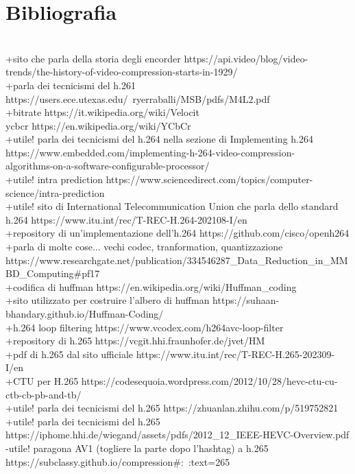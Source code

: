 \documentclass[a4paper,12pt, oneside]{article}
\begin{document}
\section{Bibliografia}
\\+sito che parla della storia degli encorder https://api.video/blog/video-trends/the-history-of-video-compression-starts-in-1929/
\\+parla dei tecnicismi del h.261 https://users.ece.utexas.edu/~ryerraballi/MSB/pdfs/M4L2.pdf
\\+bitrate https://it.wikipedia.org/wiki/Velocit%
\\ycbcr https://en.wikipedia.org/wiki/YCbCr
\\+utile! parla dei tecnicismi del h.264 nella sezione di Implementing h.264 https://www.embedded.com/implementing-h-264-video-compression-\\algorithms-on-a-software-configurable-processor/
\\+utile! intra prediction https://www.sciencedirect.com/topics/computer-science/intra-prediction
\\+utile! sito di International Telecommunication Union che parla dello standard h.264 https://www.itu.int/rec/T-REC-H.264-202108-I/en
\\+repository di un'implementazione dell'h.264 https://github.com/cisco/openh264
\\+parla di molte cose... vechi codec, tranformation, quantizzazione https://www.researchgate.net/publication/334546287_Data_Reduction_in_MMBD_Computing#pf17
\\+codifica di huffman https://en.wikipedia.org/wiki/Huffman_coding
\\+sito utilizzato per costruire l'albero di huffman https://suhaan-bhandary.github.io/Huffman-Coding/
\\+h.264 loop filtering https://www.vcodex.com/h264avc-loop-filter
\\+repository di h.265 https://vcgit.hhi.fraunhofer.de/jvet/HM
\\+pdf di h.265 dal sito ufficiale https://www.itu.int/rec/T-REC-H.265-202309-I/en
\\+CTU per H.265 https://codesequoia.wordpress.com/2012/10/28/hevc-ctu-cu-ctb-cb-pb-and-tb/
\\+utile! parla dei tecnicismi del h.265 https://zhuanlan.zhihu.com/p/519752821
\\+utile! parla dei tecnicismi del h.265 https://iphome.hhi.de/wiegand/assets/pdfs/2012_12_IEEE-HEVC-Overview.pdf
\\-utile! paragona AV1 (togliere la parte dopo l'hashtag) a h.265 https://subclassy.github.io/compression#:~:text=265%
\end{document}
